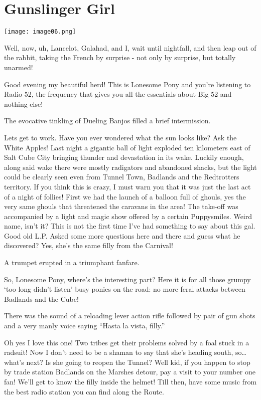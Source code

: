 \chapter{Gunslinger Girl}

\texttt{[image: image06.png]}


\begin{intro}
    Well, now, uh, Lancelot, Galahad, and I, wait until nightfall, and then leap out of the rabbit, taking the French by surprise - not only by surprise, but totally unarmed!
\end{intro}

{\rt Good evening my beautiful herd! This is Lonesome Pony and you're listening to Radio 52, the frequency that gives you all the essentials about Big 52 and nothing else!}

The evocative tinkling of Dueling Banjos filled a brief intermission.

{\rt Lets get to work. Have you ever wondered what the sun looks like? Ask the White Apples! Last night a gigantic ball of light exploded ten kilometers east of Salt Cube City bringing thunder and devastation in its wake. Luckily enough, along said wake there were mostly radigators and abandoned shacks, but the light could be clearly seen even from Tunnel Town, Badlands and the Redtrotters territory. If you think this is crazy, I must warn you that it was just the last act of a night of follies! First we had the launch of a balloon full of ghouls, yes the very same ghouls that threatened the caravans in the area! The take-off was accompanied by a light and magic show offered by a certain Puppysmiles. Weird name, isn't it? This is not the first time I've had something to say about this gal. Good old L.P. Asked some more questions here and there and guess what he discovered? Yes, she's the same filly from the Carnival!}

A trumpet erupted in a triumphant fanfare.

{\rt So, Lonesome Pony, where's the interesting part? Here it is for all those grumpy `too long didn't listen' busy ponies on the road: no more feral attacks between Badlands and the Cube!}

There was the sound of a reloading lever action rifle followed by pair of gun shots and a very manly voice saying ``Hasta la vista, filly.''

{\rt Oh yes I love this one! Two tribes get their problems solved by a foal stuck in a radsuit! Now I don't need to be a shaman to say that she's heading south, so\dots what's next? Is she going to reopen the Tunnel? Well kid, if you happen to stop by trade station Badlands on the Marshes detour, pay a visit to your number one fan! We'll get to know the filly inside the helmet! Till then, have some music from the best radio station you can find along the Route.}


